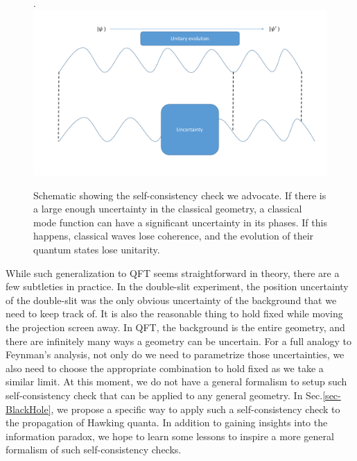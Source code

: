 \documentclass[aps,showpacs,onecolumn,floats,prd,superscriptaddress,nofootinbib]{revtex4-1}
\begin{document}
\begin{figure}[tb]
\begin{center}.
\includegraphics[scale = 0.5]{bh_coherence.pdf}
\caption{Schematic showing the self-consistency check we advocate. 
If there is a large enough uncertainty in the classical geometry, a classical mode function can have a significant uncertainty in its phases.
If this happens, classical waves lose coherence, and the evolution of their quantum states lose unitarity.}
\label{fig-QFT}
\end{center}
\end{figure}

While such generalization to QFT seems straightforward in theory, there are a few subtleties in practice.
In the double-slit experiment, the position uncertainty of the double-slit was the only obvious uncertainty of the background that we need to keep track of.
It is also the reasonable thing to hold fixed while moving the projection screen away.
In QFT, the background is the entire geometry, and there are infinitely many ways a geometry can be uncertain.
For a full analogy to Feynman's analysis, not only do we need to parametrize those uncertainties, we also need to choose the appropriate combination to hold fixed as we take a similar limit.
At this moment, we do not have a general formalism to setup such self-consistency check that can be applied to any general geometry. 
In Sec.\ref{sec-BlackHole}, we propose a specific way to apply such a self-consistency check to the propagation of Hawking quanta.
In addition to gaining insights into the information paradox, we hope to learn some lessons to inspire a more general formalism of such self-consistency checks.
\end{document}

